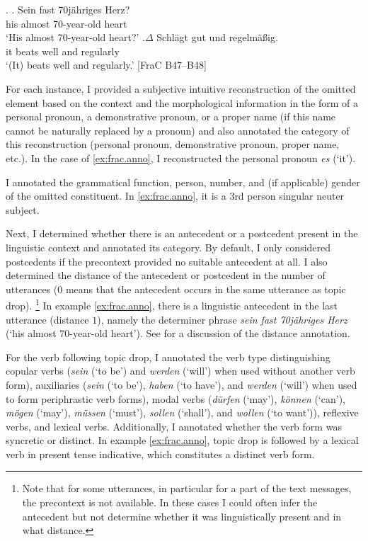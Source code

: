 \ex.\label{ex:frac.anno}
\ag. Sein fast 70jähriges Herz?\\
his almost 70-year-old heart\\
`His almost 70-year-old heart?'
\bg.\label{ex:frac.anno.td}$\Delta$ Schlägt gut und regelmäßig.\\
it beats well and regularly\\
`(It) beats well and regularly.' [FraC B47--B48]

For each instance, I provided a subjective intuitive reconstruction of the omitted element based on the context and the morphological information in the form of a personal pronoun, a demonstrative pronoun, or a proper name (if this name cannot be naturally replaced by a pronoun) and also annotated the category of this reconstruction (personal pronoun, demonstrative pronoun, proper name, etc.).
In the case of \ref{ex:frac.anno}, I reconstructed the personal pronoun \textit{es} (`it').

I annotated the grammatical function, person, number, and (if applicable) gender of the omitted constituent.
In \ref{ex:frac.anno}, it is a 3rd person singular neuter subject.

Next, I determined whether there is an antecedent or a postcedent present in the linguistic context and annotated its category. 
By default, I only considered postcedents if the precontext provided no suitable antecedent at all. 
I also determined the distance of the antecedent  or postcedent in the number of utterances (0 means that the antecedent occurs in the same utterance as topic drop).%
\footnote{\label{note:precontext}Note that for some utterances, in particular for a part of the text messages, the precontext is not available.
In these cases I could often infer the antecedent  but not determine whether it was linguistically present and in what distance.}
%
In example \ref{ex:frac.anno}, there is a linguistic antecedent  in the last utterance (distance $1$), namely the determiner phrase \textit{sein fast 70jähriges Herz} (`his almost 70-year-old heart').
See  for a discussion of the distance annotation.

For the verb following topic drop, I annotated the verb type distinguishing copular verbs  (\textit{sein} (`to be') and \textit{werden} (`will') when used without another verb form), auxiliaries  (\textit{sein} (`to be'), \textit{haben} (`to have'), and \textit{werden} (`will') when used to form periphrastic verb forms), modal verbs  (\textit{dürfen} (`may'), \textit{können} (`can'), \textit{mögen} (`may'), \textit{müssen} (`must'), \textit{sollen} (`shall'), and \textit{wollen} (`to want')), reflexive verbs,  and lexical verbs. 
Additionally, I annotated whether the verb form was syncretic  or distinct.
In example \ref{ex:frac.anno}, topic drop is followed by a lexical verb in present tense indicative, which constitutes a distinct verb form.

